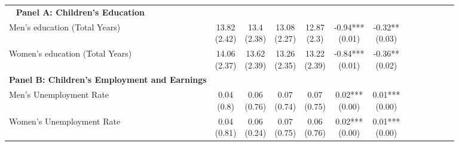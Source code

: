 \begin{landscape}
\begin{ThreePartTable}
\begin{longtable}[t]{>{\raggedright\arraybackslash}p{5cm}cccccc}
\midrule
\endhead
\midrule
\multicolumn{7}{r@{}}{\textit{(Continued on Next Page...)}}\
\endfoot
\bottomrule
\insertTableNotes
\endlastfoot
\textbf{Panel A: Children's Education} & \textbf{} & \textbf{} & \textbf{} & \textbf{} & \textbf{} & \textbf{}\\
\hspace{1em}Men’s education (Total Years) & \specialcell{13.82\\(2.42)} & \specialcell{13.4\\(2.38)} & \specialcell{13.08\\(2.27)} & \specialcell{12.87\\(2.3)} & \specialcell{-0.94***\\(0.01)} & \specialcell{-0.32**\\(0.03)}\\
\hspace{1em}Women’s education (Total Years) & \specialcell{14.06\\(2.37)} & \specialcell{13.62\\(2.39)} & \specialcell{13.26\\(2.35)} & \specialcell{13.22\\(2.39)} & \specialcell{-0.84***\\(0.01)} & \specialcell{-0.36**\\(0.02)}\\
\textbf{Panel B: Children's Employment and Earnings} & \textbf{} & \textbf{} & \textbf{} & \textbf{} & \textbf{} & \textbf{}\\
\hspace{1em}Men’s Unemployment Rate & \specialcell{0.04\\(0.8)} & \specialcell{0.06\\(0.76)} & \specialcell{0.07\\(0.74)} & \specialcell{0.07\\(0.75)} & \specialcell{0.02***\\(0.00)} & \specialcell{0.01***\\(0.00)}\\
\addlinespace
\hspace{1em}Women’s Unemployment Rate & \specialcell{0.04\\(0.81)} & \specialcell{0.06\\(0.24)} & \specialcell{0.07\\(0.75)} & \specialcell{0.06\\(0.76)} & \specialcell{0.02***\\(0.00)} & \specialcell{0.01***\\(0.00)}\\

\end{longtable}
\end{ThreePartTable}
\end{landscape}
